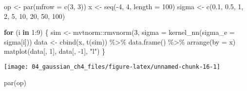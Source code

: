 \documentclass[
]{article}
\newenvironment{Shaded}{\begin{snugshade}}{\end{snugshade}}
\newcommand{\AttributeTok}[1]{\textcolor[rgb]{0.77,0.63,0.00}{#1}}
\newcommand{\ControlFlowTok}[1]{\textcolor[rgb]{0.13,0.29,0.53}{\textbf{#1}}}
\newcommand{\DecValTok}[1]{\textcolor[rgb]{0.00,0.00,0.81}{#1}}
\newcommand{\FloatTok}[1]{\textcolor[rgb]{0.00,0.00,0.81}{#1}}
\newcommand{\FunctionTok}[1]{\textcolor[rgb]{0.00,0.00,0.00}{#1}}
\newcommand{\NormalTok}[1]{#1}
\newcommand{\OtherTok}[1]{\textcolor[rgb]{0.56,0.35,0.01}{#1}}
\newcommand{\SpecialCharTok}[1]{\textcolor[rgb]{0.00,0.00,0.00}{#1}}
\newcommand{\StringTok}[1]{\textcolor[rgb]{0.31,0.60,0.02}{#1}}
\begin{document}
\begin{Shaded}
\begin{Highlighting}[]
\NormalTok{op }\OtherTok{\textless{}{-}} \FunctionTok{par}\NormalTok{(}\AttributeTok{mfrow =} \FunctionTok{c}\NormalTok{(}\DecValTok{3}\NormalTok{, }\DecValTok{3}\NormalTok{))}
\NormalTok{x }\OtherTok{\textless{}{-}} \FunctionTok{seq}\NormalTok{(}\SpecialCharTok{{-}}\DecValTok{4}\NormalTok{, }\DecValTok{4}\NormalTok{, }\AttributeTok{length =} \DecValTok{100}\NormalTok{)}
\NormalTok{sigma }\OtherTok{\textless{}{-}} \FunctionTok{c}\NormalTok{(}\FloatTok{0.1}\NormalTok{, }\FloatTok{0.5}\NormalTok{, }\DecValTok{1}\NormalTok{, }
           \DecValTok{2}\NormalTok{, }\DecValTok{5}\NormalTok{, }\DecValTok{10}\NormalTok{, }
           \DecValTok{20}\NormalTok{, }\DecValTok{50}\NormalTok{, }\DecValTok{100}\NormalTok{)}

\ControlFlowTok{for}\NormalTok{ (i }\ControlFlowTok{in} \DecValTok{1}\SpecialCharTok{:}\DecValTok{9}\NormalTok{) \{}
\NormalTok{  sim }\OtherTok{\textless{}{-}}\NormalTok{ mvtnorm}\SpecialCharTok{::}\FunctionTok{rmvnorm}\NormalTok{(}\DecValTok{3}\NormalTok{, }\AttributeTok{sigma =} \FunctionTok{kernel\_nn}\NormalTok{(}\AttributeTok{sigma\_e =}\NormalTok{ sigma[i]))}
\NormalTok{  data }\OtherTok{\textless{}{-}} \FunctionTok{cbind}\NormalTok{(x, }\FunctionTok{t}\NormalTok{(sim)) }\SpecialCharTok{\%\textgreater{}\%} 
    \FunctionTok{data.frame}\NormalTok{() }\SpecialCharTok{\%\textgreater{}\%}
    \FunctionTok{arrange}\NormalTok{(}\AttributeTok{by =}\NormalTok{ x)}
  \FunctionTok{matplot}\NormalTok{(data[, }\DecValTok{1}\NormalTok{], data[, }\SpecialCharTok{{-}}\DecValTok{1}\NormalTok{], }\StringTok{"l"}\NormalTok{)}
\NormalTok{\}}
\end{Highlighting}
\end{Shaded}

\begin{center}\texttt{[image: 04\_gaussian\_ch4\_files/figure-latex/unnamed-chunk-16-1]} \end{center}

\begin{Shaded}
\begin{Highlighting}[]
\FunctionTok{par}\NormalTok{(op)}
\end{Highlighting}
\end{Shaded}
\end{document}
